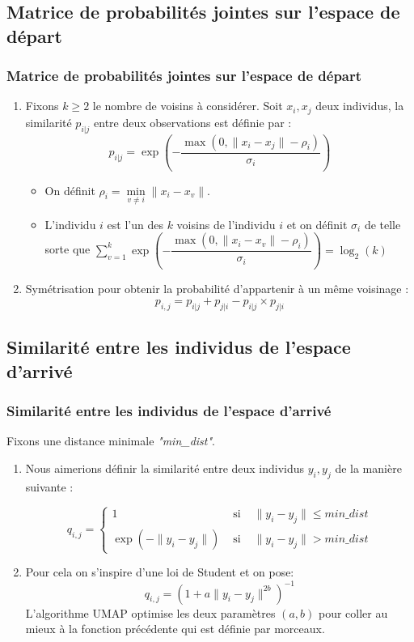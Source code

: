 \documentclass{beamer}
\theoremstyle{definition}
\begin{document}
\subsection{Matrice de probabilités jointes sur l'espace de départ}
\begin{frame}
\frametitle{Matrice de probabilités jointes sur l'espace de départ}
\begin{enumerate}
	\item Fixons $k\geq 2$ le nombre de voisins à considérer. Soit $x_i,x_j$ deux individus, la similarité $p_{i|j}$ entre deux observations est définie par :$$p_{i|j} = \exp\left(-\dfrac{\max(0,\|x_i -x_j\|-\rho_i)}{\sigma_i}\right)$$

	\begin{itemize}
		\item  On définit $\rho_i = \underset{v\neq i}{\min}\|x_i-x_v\|$.
		\item L'individu $i$ est l'un des $k$ voisins de l'individu $i$ et on définit $\sigma_i$ de telle sorte que $\displaystyle \sum_{v=1}^{k}\exp\left(-\dfrac{\max(0,\|x_i -x_v\|-\rho_i)}{\sigma_i}\right) = \log_2(k)$
	\end{itemize}
	\item Symétrisation pour obtenir la probabilité d'appartenir à un même voisinage : 
	$$p_{i,j} = p_{i|j} + p_{j|i} - p_{i|j} \times p_{j|i}$$ 
\end{enumerate}


	
\end{frame}

\subsection{Similarité entre les individus de l'espace d'arrivé}
\begin{frame}
	\frametitle{Similarité entre les individus de l'espace d'arrivé}
	Fixons une distance minimale \textit{"min\_dist"}.
	\begin{enumerate}
		\item Nous aimerions définir la similarité entre deux individus $y_i,y_j$ de la manière suivante : 
		
	 $$q_{i,j} = \left\{ \begin{array}{ccc}
			1 &\text{ si } & \|y_i-y_j\|\leq \textit{min\_dist}\\
			\exp(-\|y_i-y_j\|) &\text{ si } & \|y_i-y_j\|> \textit{min\_dist}
		\end{array}\right.$$
	
		\item Pour cela on s'inspire d'une loi de Student et on pose:
		$$q_{i,j} = \left(1+ a\|y_i-y_j\|^{2b}\right)^{-1}$$ 
		L'algorithme UMAP optimise les deux paramètres $(a,b)$ pour coller au mieux à la fonction précédente qui est définie par morceaux.  
	\end{enumerate}
	
	
\end{frame}
\end{document}
